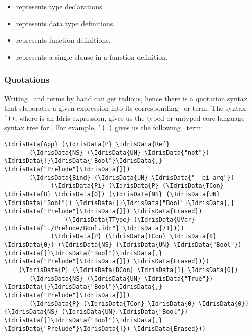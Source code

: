 \begin{itemize}
\item{} represents type declarations.
\item{} represents data type definitions.
\item{} represents function definitions.
\item{} represents a single clause in a function definition.
\end{itemize}

\subsubsection{Quotations}

Writing \TT\ and  terms by hand can get tedious, hence there is a
quotation syntax that elaborates a given expression into its corresponding
\TT\ or  term.\cite{idrisQuotation}
The syntax \texttt{\`{}()}, where  is an Idris expression, gives
us the typed or untyped core language syntax tree for . For example,
\texttt{\`{}( )} gives us the following \TT\ term:
\begin{Verbatim}[framesep=2mm, label=\footnotesize{\normalfont{Idris}}, labelposition=topline]
\IdrisData{App} (\IdrisData{P} \IdrisData{Ref}
       (\IdrisData{NS} (\IdrisData{UN} \IdrisData{"not"}) \IdrisData{[}\IdrisData{"Bool"}\IdrisData{,} \IdrisData{"Prelude"}\IdrisData{]})
       (\IdrisData{Bind} (\IdrisData{UN} \IdrisData{"__pi_arg"})
             (\IdrisData{Pi} (\IdrisData{P} (\IdrisData{TCon} \IdrisData{8} \IdrisData{0}) (\IdrisData{NS} (\IdrisData{UN} \IdrisData{"Bool"}) \IdrisData{[}\IdrisData{"Bool"}\IdrisData{,} \IdrisData{"Prelude"}\IdrisData{]}) \IdrisData{Erased})
                 (\IdrisData{TType} (\IdrisData{UVar} \IdrisData{"./Prelude/Bool.idr"} \IdrisData{71})))
             (\IdrisData{P} (\IdrisData{TCon} \IdrisData{8} \IdrisData{0}) (\IdrisData{NS} (\IdrisData{UN} \IdrisData{"Bool"}) \IdrisData{[}\IdrisData{"Bool"}\IdrisData{,} \IdrisData{"Prelude"}\IdrisData{]}) \IdrisData{Erased})))
    (\IdrisData{P} (\IdrisData{DCon} \IdrisData{1} \IdrisData{0})
       (\IdrisData{NS} (\IdrisData{UN} \IdrisData{"True"}) \IdrisData{[}\IdrisData{"Bool"}\IdrisData{,} \IdrisData{"Prelude"}\IdrisData{]})
       (\IdrisData{P} (\IdrisData{TCon} \IdrisData{0} \IdrisData{0}) (\IdrisData{NS} (\IdrisData{UN} \IdrisData{"Bool"}) \IdrisData{[}\IdrisData{"Bool"}\IdrisData{,} \IdrisData{"Prelude"}\IdrisData{]}) \IdrisData{Erased}))
\end{Verbatim}

